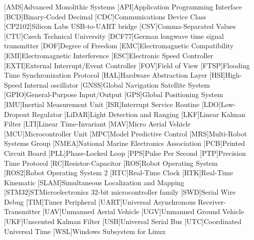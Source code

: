 \begin{acronym}
  [AMS]{Advanced Monolithic Systems}
  [API]{Application Programming Interface}	
  [BCD]{Binary-Coded Decimal}
  [CDC]{Communications Device Class}
  [CP2102]{Silicon Labs USB-to-UART bridge}
  [CSV]{Comma-Separated Values}
  [CTU]{Czech Technical University}
  [DCF77]{German longwave time signal transmitter}
  [DOF]{Degree of Freedom}
  [EMC]{Electromagnetic Compatibility}
  [EMI]{Electromagnetic Interference}
  [ESC]{Electronic Speed Controller}
  [EXTI]{External Interrupt/Event Controller}
  [FOV]{Field of View}
  [FTSP]{Flooding Time Synchronization Protocol}
  [HAL]{Hardware Abstraction Layer}
  [HSI]{High-Speed Internal oscillator}
  [GNSS]{Global Navigation Satellite System}
  [GPIO]{General-Purpose Input/Output}
  [GPS]{Global Positioning System}
  [IMU]{Inertial Measurement Unit}
  [ISR]{Interrupt Service Routine}
  [LDO]{Low-Dropout Regulator}
  [LiDAR]{Light Detection and Ranging}
  [LKF]{Linear Kalman Filter}
  [LTI]{Linear Time-Invariant}
  [MAV]{Micro Aerial Vehicle}
  [MCU]{Microcontroller Unit}
  [MPC]{Model Predictive Control}
  [MRS]{Multi-Robot Systems Group}
  [NMEA]{National Marine Electronics Association}
  [PCB]{Printed Circuit Board}
  [PLL]{Phase-Locked Loop}
  [PPS]{Pulse Per Second}
  [PTP]{Precision Time Protocol}
  [RC]{Resistor-Capacitor}
  [ROS]{Robot Operating System}
  [ROS2]{Robot Operating System 2}
  [RTC]{Real-Time Clock}
  [RTK]{Real-Time Kinematic}
  [SLAM]{Simultaneous Localization and Mapping}
  [STM32]{STMicroelectronics 32-bit microcontroller family}
  [SWD]{Serial Wire Debug}
  [TIM]{Timer Peripheral}
  [UART]{Universal Asynchronous Receiver-Transmitter}
  [UAV]{Unmanned Aerial Vehicle}
  [UGV]{Unmanned Ground Vehicle}
  [UKF]{Unscented Kalman Filter}
  [USB]{Universal Serial Bus}
  [UTC]{Coordinated Universal Time}
  [WSL]{Windows Subsystem for Linux}
\end{acronym}